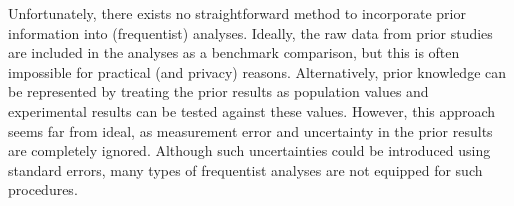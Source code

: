 \documentclass[a4paper]{article}
\begin{document}

Unfortunately, there exists no straightforward method to incorporate prior information into (frequentist) analyses. 
Ideally, the raw data from prior studies are included in the analyses as a benchmark comparison, but this is often impossible for practical (and privacy) reasons.
Alternatively, prior knowledge can be represented by treating the prior results as population values and experimental results can be tested against these values.
However, this approach seems far from ideal, as measurement error and uncertainty in the prior results are completely ignored.
Although such uncertainties could be introduced using standard errors, many types of frequentist analyses are not equipped for such procedures.
\end{document}
